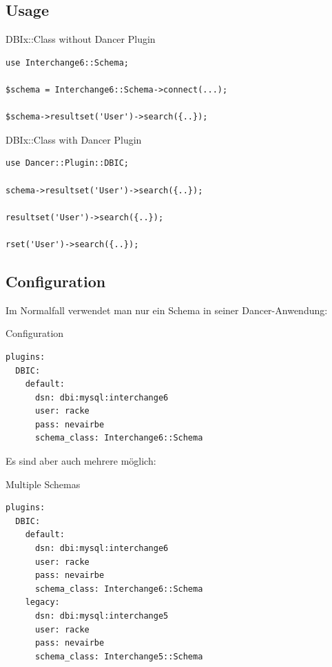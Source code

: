 \subsection{Usage}
\begin{frame}[fragile]{DBIx::Class without Dancer Plugin}
\begin{lstlisting}
use Interchange6::Schema;

$schema = Interchange6::Schema->connect(...);

$schema->resultset('User')->search({..});
\end{lstlisting}
\end{frame}

\begin{frame}[fragile]{DBIx::Class with Dancer Plugin}
\begin{lstlisting}
use Dancer::Plugin::DBIC;

schema->resultset('User')->search({..});

resultset('User')->search({..});

rset('User')->search({..});
\end{lstlisting}
\end{frame}

\subsection{Configuration}

Im Normalfall verwendet man nur ein Schema in seiner
Dancer-Anwendung:

\begin{frame}[fragile]{Configuration}
\begin{lstlisting}
plugins:
  DBIC:
    default:
      dsn: dbi:mysql:interchange6
      user: racke
      pass: nevairbe
      schema_class: Interchange6::Schema
\end{lstlisting}
\end{frame}

Es sind aber auch mehrere möglich:

\begin{frame}[fragile]{Multiple Schemas}
\begin{lstlisting}
plugins:
  DBIC:
    default:
      dsn: dbi:mysql:interchange6
      user: racke
      pass: nevairbe
      schema_class: Interchange6::Schema
    legacy:
      dsn: dbi:mysql:interchange5
      user: racke
      pass: nevairbe
      schema_class: Interchange5::Schema
\end{lstlisting}
\end{frame}

